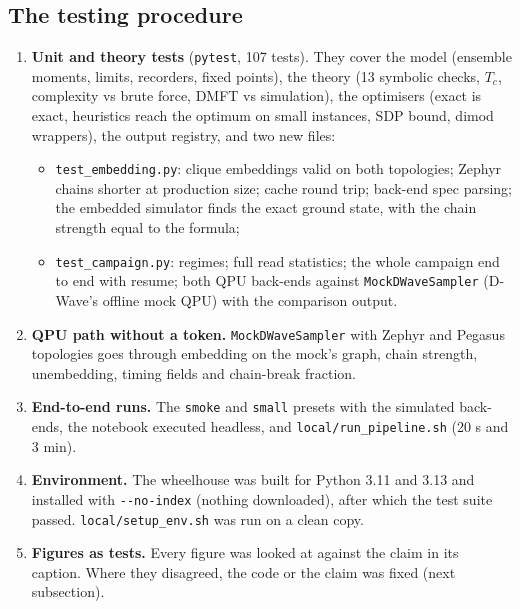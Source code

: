 \documentclass[11pt,a4paper]{article}
\newcommand{\code}[1]{\nolinkurl{#1}}
\begin{document}
\subsection{The testing procedure}
\begin{enumerate}
\item \textbf{Unit and theory tests} (\code{pytest}, 107 tests). They cover the model (ensemble moments, limits, recorders, fixed points), the theory (13 symbolic checks, $T_c$, complexity vs brute force, DMFT vs simulation), the optimisers (exact is exact, heuristics reach the optimum on small instances, SDP bound, dimod wrappers), the output registry, and two new files:
\begin{itemize}
\item \code{test_embedding.py}: clique embeddings valid on both topologies; Zephyr chains shorter at production size; cache round trip; back-end spec parsing; the embedded simulator finds the exact ground state, with the chain strength equal to the formula;
\item \code{test_campaign.py}: regimes; full read statistics; the whole campaign end to end with resume; both QPU back-ends against \code{MockDWaveSampler} (D-Wave's offline mock QPU) with the comparison output.
\end{itemize}
\item \textbf{QPU path without a token.} \code{MockDWaveSampler} with Zephyr and Pegasus topologies goes through embedding on the mock's graph, chain strength, unembedding, timing fields and chain-break fraction.
\item \textbf{End-to-end runs.} The \code{smoke} and \code{small} presets with the simulated back-ends, the notebook executed headless, and \code{local/run_pipeline.sh} (20 s and 3 min).
\item \textbf{Environment.} The wheelhouse was built for Python 3.11 and 3.13 and installed with \code{--no-index} (nothing downloaded), after which the test suite passed. \code{local/setup_env.sh} was run on a clean copy.
\item \textbf{Figures as tests.} Every figure was looked at against the claim in its caption. Where they disagreed, the code or the claim was fixed (next subsection).
\end{enumerate}
\end{document}

